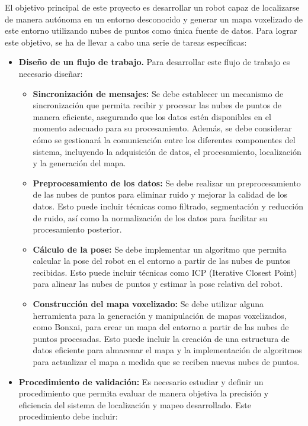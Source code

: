 \documentclass[12pt, a4paper, twoside]{article}
\begin{document}
El objetivo principal de este proyecto es desarrollar un robot capaz de localizarse de manera autónoma en un entorno desconocido y 
generar un mapa voxelizado de este entorno utilizando nubes de puntos como única fuente de datos. Para lograr este objetivo, se ha 
de llevar a cabo una serie de tareas específicas:
\begin{itemize}
  \item \textbf{Diseño de un flujo de trabajo.} Para desarrollar este flujo de trabajo es necesario diseñar:
   \begin{itemize}
    \item \textbf{Sincronización de mensajes:} Se debe establecer un mecanismo de sincronización que permita 
      recibir y procesar las nubes de puntos de manera eficiente, asegurando que los datos estén disponibles en el momento 
      adecuado para su procesamiento. Además, se debe considerar cómo se gestionará la comunicación entre los diferentes 
      componentes del sistema, incluyendo la adquisición de datos, el procesamiento, localización y la generación del mapa.
    \item \textbf{Preprocesamiento de los datos:} Se debe realizar un preprocesamiento de las nubes de puntos 
      para eliminar ruido y mejorar la calidad de los datos. Esto puede incluir técnicas como filtrado, segmentación y 
      reducción de ruido, así como la normalización de los datos para facilitar su procesamiento posterior.
    \item \textbf{Cálculo de la pose:} Se debe implementar un algoritmo que permita calcular la pose del robot en el entorno 
      a partir de las nubes de puntos recibidas. Esto puede incluir técnicas como ICP (Iterative Closest Point) para 
      alinear las nubes de puntos y estimar la pose relativa del robot.
    \item \textbf{Construcción del mapa voxelizado:} Se debe utilizar alguna herramienta para la generación y manipulación 
      de mapas voxelizados, como Bonxai, para crear un mapa del entorno a partir de las nubes de puntos procesadas. 
      Esto puede incluir la creación de una estructura de datos eficiente para almacenar el mapa y la implementación de 
      algoritmos para actualizar el mapa a medida que se reciben nuevas nubes de puntos.
    \end{itemize}
  \item \textbf{Procedimiento de validación:} Es necesario estudiar y definir un procedimiento que permita evaluar de manera 
    objetiva la precisión y eficiencia del sistema de localización y mapeo desarrollado. Este procedimiento debe incluir:

\end{itemize}
\end{document}
